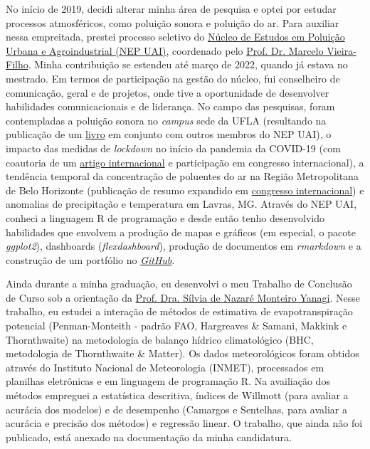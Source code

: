 \documentclass[12pt,a4paper]{article}
\begin{document}
	No início de 2019, decidi alterar minha área de pesquisa e optei por estudar processos atmosféricos, como poluição sonora e poluição do ar. Para auxiliar nessa empreitada, prestei processo seletivo do \href{https://sites.google.com/ufla.br/nepuai?pli=1}{Núcleo de Estudos em Poluição Urbana e Agroindustrial (NEP UAI)}, coordenado pelo \href{http://lattes.cnpq.br/5059318976988668}{Prof. Dr. Marcelo Vieira-Filho}. Minha contribuição se estendeu até março de 2022, quando já estava no mestrado. Em termos de participação na gestão do núcleo, fui conselheiro de comunicação, geral e de projetos, onde tive a oportunidade de desenvolver habilidades comunicacionais e de liderança. No campo das pesquisas, foram contempladas a poluição sonora no \textit{campus} sede da UFLA (resultando na publicação de um \href{https://sites.google.com/ufla.br/nepuai/publica%C3%A7%C3%B5es/livros?authuser=0}{livro} em conjunto com outros membros do NEP UAI), o impacto das medidas de \textit{lockdown} no início da pandemia da COVID-19 (com coautoria de um \href{https://link.springer.com/article/10.1007/s11869-020-00959-8}{artigo internacional} e participação em congresso internacional), a tendência temporal da concentração de poluentes do ar na Região Metropolitana de Belo Horizonte (publicação de resumo expandido em \href{https://www.inicepg.univap.br/cd/INIC_2021/anais/arquivos/RE_0771_0575_01.pdf}{congresso internacional}) e anomalias de precipitação e temperatura em Lavras, MG. Através do NEP UAI, conheci a linguagem R de programação e desde então tenho desenvolvido habilidades que envolvem a produção de mapas e gráficos (em especial, o pacote \textit{ggplot2}), dashboards (\textit{flexdashboard}), produção de documentos em \textit{rmarkdown} e a construção de um portfólio no \href{https://arthurboari.github.io/arthurboari/}{\textit{GitHub}}.
	
	Ainda durante a minha graduação, eu desenvolvi o meu Trabalho de Conclusão de Curso sob a orientação da \href{http://lattes.cnpq.br/3943657653311716}{Prof. Dra. Sílvia de Nazaré Monteiro Yanagi}. Nesse trabalho, eu estudei a interação de métodos de estimativa de evapotranspiração potencial (Penman-Monteith - padrão FAO, Hargreaves \& Samani, Makkink e Thornthwaite) na metodologia de balanço hídrico climatológico (BHC, metodologia de Thornthwaite \& Matter). Os dados meteorológicos foram obtidos através do Instituto Nacional de Meteorologia (INMET), processados em planilhas eletrônicas e em linguagem de programação R. Na availiação dos métodos empreguei a estatística descritiva, índices de Willmott (para avaliar a acurácia dos modelos) e de desempenho (Camargos e Sentelhas, para avaliar a acurácia e precisão dos métodos) e regressão linear. O trabalho, que ainda não foi publicado, está anexado na documentação da minha candidatura.
	
\end{document}
